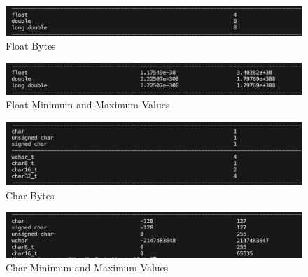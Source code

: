 \documentclass[12pt]{article}
\begin{document}
\begin{figure}[h]
    \centering
    \includegraphics[width=1\textwidth]{floatByte.png} 
    \caption{Float Bytes}
    \label{fig:example-image}
\end{figure}
\begin{figure}[h]
    \centering
    \includegraphics[width=1\textwidth]{floatMinMax.png} 
    \caption{Float Minimum and Maximum Values}
    \label{fig:example-image}
\end{figure}
\begin{figure}[h]
    \centering
    \includegraphics[width=1\textwidth]{charByte.png} 
    \caption{Char Bytes}
    \label{fig:example-image}
\end{figure}
\begin{figure}[h]
    \centering
    \includegraphics[width=1\textwidth]{charMinMax.png} 
    \caption{Char Minimum and Maximum Values}
    \label{fig:example-image}
\end{figure}
\end{document}
